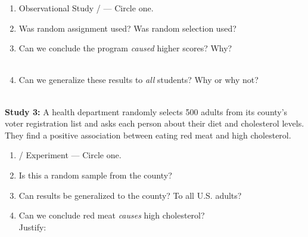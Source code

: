 \documentclass[10pt]{article}
\begin{document}
\begin{practicebox}
\small
\begin{enumerate}[leftmargin=1.5em, itemsep=8pt]
  \item Observational Study \quad / \quad {} --- Circle one.
  \item Was random assignment used?  \quad Was random selection used? 
  \item Can we conclude the program \emph{caused} higher scores? Why?\\
        \\[1pt]
  \item Can we generalize these results to \emph{all} students? Why or why not?\\
        \\[1pt]
\end{enumerate}
\end{practicebox}

\vspace{0.1in}

\textbf{Study 3:} A health department randomly selects 500 adults from its county's
voter registration list and asks each person about their diet and cholesterol levels.
They find a positive association between eating red meat and high cholesterol.

\begin{practicebox}
\small
\begin{enumerate}[leftmargin=1.5em, itemsep=8pt]
  \item {} \quad / \quad Experiment --- Circle one.
  \item Is this a random sample from the county? 
  \item Can results be generalized to the county?  To all U.S. adults? 
  \item Can we conclude red meat \emph{causes} high cholesterol? \\
        Justify: 
\end{enumerate}
\end{practicebox}
\end{document}
